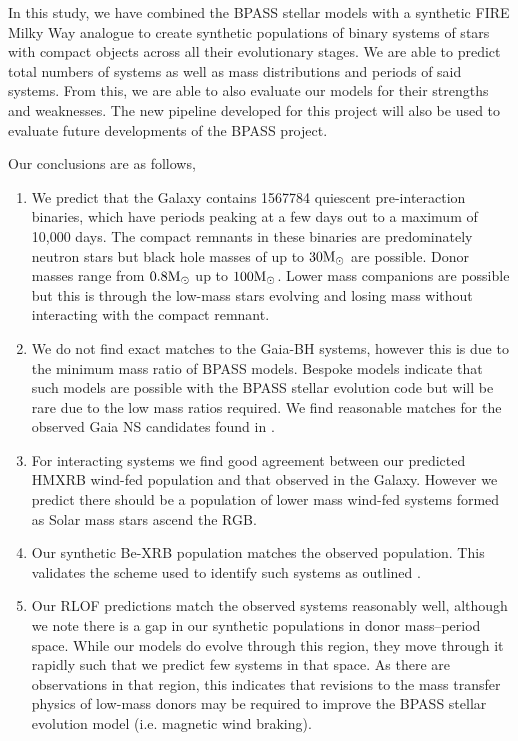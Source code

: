 \documentclass{pas}
\begin{document}
In this study, we have combined the \textsc{BPASS} stellar models with a synthetic \textsc{FIRE} Milky Way analogue to create synthetic populations of binary systems of stars with compact objects across all their evolutionary stages. We are able to predict total numbers of systems as well as mass distributions and periods of said systems. From this, we are able to also evaluate our models for their strengths and weaknesses. The new pipeline developed for this project will also be used to evaluate future developments of the \textsc{BPASS} project.

Our conclusions are as follows,
\begin{enumerate}
    \item We predict that the Galaxy contains 1567784 quiescent pre-interaction binaries, which have periods peaking at a few days out to a maximum of 10,000 days. The compact remnants in these binaries are predominately neutron stars but black hole masses of up to $30{\rm M_{\odot}}$ are possible. Donor masses range from $0.8{\rm M_{\odot}}$ up to $100{\rm M_{\odot}}$. Lower mass companions are possible but this is through the low-mass stars evolving and losing mass without interacting with the compact remnant.
    \item We do not find exact matches to the Gaia-BH systems, however this is due to the minimum mass ratio of \textsc{BPASS} models. Bespoke models indicate that such models are possible with the \textsc{BPASS} stellar evolution code but will be rare due to the low mass ratios required. We find reasonable matches for the observed Gaia NS candidates found in \citet{elbadry2024populationneutronstarcandidates}.
    \item For interacting systems we find good agreement between our predicted HMXRB wind-fed population and that observed in the Galaxy. However we predict there should be a population of lower mass wind-fed systems formed as Solar mass stars ascend the RGB.
    \item Our synthetic Be-XRB population matches the observed population. This validates the scheme used to identify such systems as outlined \citet{2025MNRAS.542.2087B}.
    \item Our RLOF predictions match the observed systems reasonably well, although we note there is a gap in our synthetic populations in donor mass--period space. While our models do evolve through this region, they move through it rapidly such that we predict few systems in that space. As there are observations in that region, this indicates that revisions to the mass transfer physics of low-mass donors may be required to improve the \textsc{BPASS} stellar evolution model (i.e. magnetic wind braking).

\end{enumerate}
\end{document}
